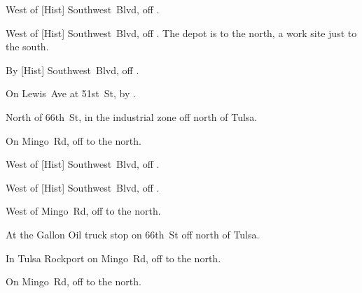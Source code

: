 
\begin{LocationList}

\Location{\GarageHQ \Garage}
West of [Hist] Southwest~Blvd, off  .

West of [Hist] Southwest~Blvd, off  .
The depot is to the north, a work site just to the south.

By [Hist] Southwest~Blvd, off  .

On Lewis~Ave at 51st~St, by  .

North of 66th~St, in the industrial zone off  north of Tulsa.

On Mingo~Rd, off  to the north.

West of [Hist] Southwest~Blvd, off  .

\Location{\TruckService \Service}
West of [Hist] Southwest~Blvd, off  .

West of Mingo~Rd, off  to the north.

At the Gallon Oil truck stop on 66th~St off  north of Tulsa.

In Tulsa Rockport on Mingo~Rd, off  to the north.

On Mingo~Rd, off  to the north.

\end{LocationList}
